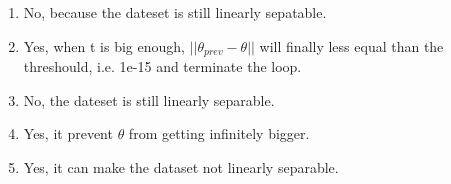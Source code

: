 \begin{answer}
    \begin{enumerate}
        \item No, because the dateset is still linearly sepatable.
        \item Yes, when t is big enough, $||\theta_{prev} - \theta||$ will finally less 
        equal than the threshould, i.e. 1e-15 and terminate the loop.
        \item No, the dateset is still linearly separable.
        \item Yes, it prevent $\theta$ from getting infinitely bigger.
        \item Yes, it can make the dataset not linearly separable.
      \end{enumerate}
\end{answer}
